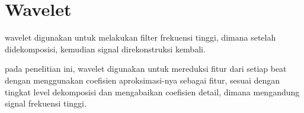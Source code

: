 \section{Wavelet}
\label{sec:wt}

wavelet digunakan untuk melakukan filter frekuensi tinggi,
dimana setelah didekomposisi, kemudian signal direkonstruksi kembali.

pada penelitian ini, wavelet digunakan untuk mereduksi fitur dari setiap beat
dengan menggunakan coefisien aproksimasi-nya sebagai fitur, sesuai dengan
tingkat level dekomposisi dan mengabaikan coefisien detail, dimana mengandung
signal frekuensi tinggi.
